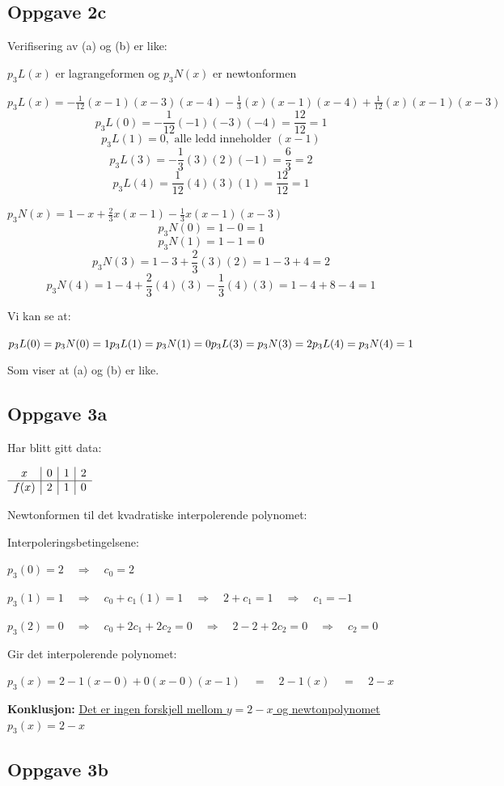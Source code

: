 \documentclass{article}
\newcommand{\uu}[1]{\underline{\underline{#1}}}
\newcommand{\req}{\quad\Longrightarrow\quad}
\newcommand{\eqq}{\quad=\quad}
\begin{document}
\newpage

\subsection*{Oppgave 2c}
Verifisering av (a) og (b) er like:

$p_3L(x)$ er lagrangeformen og $p_3N(x)$ er newtonformen

\vspace{1em}

\(
p_3L(x) = -\frac{1}{12}(x-1)(x-3)(x-4)-\frac{1}{3}(x)(x-1)(x-4) + \frac{1}{12}(x)(x-1)(x-3)
\)
\[
p_3L(0) = -\frac{1}{12}(-1)(-3)(-4) = \frac{12}{12} = 1
\]
\[
p_3L(1) = 0, \text{  alle ledd inneholder } (x-1)
\]
\[
p_3L(3) = -\frac{1}{3}(3)(2)(-1) = \frac{6}{3} = 2
\]
\[
p_3L(4) = \frac{1}{12}(4)(3)(1) = \frac{12}{12} = 1
\]

\vspace{2em}

\(
p_3N(x) = 1- x + \frac{2}{3}x(x-1) - \frac{1}{3}x(x-1)(x-3)
\)
\[
p_3N(0) = 1-0 = 1
\]
\[p_3N(1) = 1-1 = 0\]
\[p_3N(3) = 1-3 + \frac{2}{3}(3)(2) = 1-3+4 = 2\]
\[p_3N(4) = 1 - 4 + \frac{2}{3}(4)(3) - \frac{1}{3}(4)(3) = 1 - 4 + 8 -4 = 1\]

Vi kan se at:

\(
p_3L(0) = p_3N(0) = 1 \\
p_3L(1) = p_3N(1) = 0 \\
p_3L(3) = p_3N(3) = 2 \\
p_3L(4) = p_3N(4) = 1
\)

Som viser at (a) og (b) er like.

\newpage

\subsection*{Oppgave 3a}
Har blitt gitt data:

\(
\begin{array}{c | c | c | c}
    x & 0 & 1 & 2\\ 
    \hline 
    f(x) & 2 & 1 & 0 \\ 
\end{array}
\)

Newtonformen til det kvadratiske interpolerende polynomet:

Interpoleringsbetingelsene:

\(p_3(0) = 2 \req c_0 = 2\)

\(p_3(1) = 1 \req c_0 + c_1(1) = 1 \req 2 + c_1 = 1 \req c_1 = -1\)

\(p_3(2) = 0 \req c_0 + 2c_1 + 2c_2 = 0 \req 2-2+2c_2 = 0 \req c_2 = 0\)

\vspace{1em}

Gir det interpolerende polynomet:

\(p_3(x) = 2 - 1(x-0) + 0(x-0)(x-1) \eqq 2-1(x) \eqq 2 - x\)

\vspace{1em}

\textbf{Konklusjon:} \uu{Det er ingen forskjell mellom $y = 2 - x$ og newtonpolynomet $p_3(x) = 2 - x$}

\vspace{2em}
\subsection*{Oppgave 3b}
\end{document}
